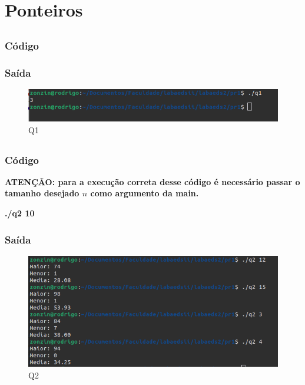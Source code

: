 \section{Ponteiros}


\subsection{}
\subsubsection*{Código}

\subsubsection*{Saída}
\begin{figure}[h!]
	\centering
	\includegraphics[width=0.7\linewidth]{imagens/screenshot001}
	\caption{Q1}
	\label{fig:screenshot001}
\end{figure}

\newpage
\subsection{}
\subsubsection*{Código}
\textbf{ATENÇÃO: para a execução correta desse código é necessário passar o tamanho desejado  $n$  como argumento da main.}

\textbf{./q2 10}

\begin{multicols}{2}
	
\end{multicols}
\subsubsection*{Saída}
\begin{figure}[h!]
	\centering
	\includegraphics[width=0.7\linewidth]{imagens/saida_q2}
	\caption{Q2}
	\label{fig:saidaq2}
\end{figure}


